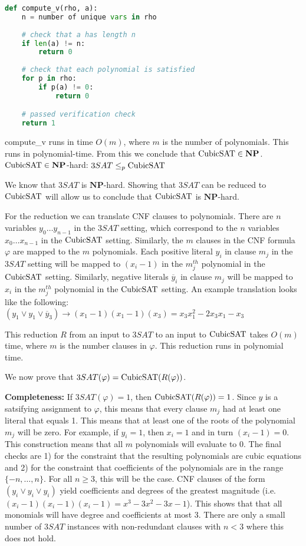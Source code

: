 \documentclass[11pt]{article}
\begin{document}
\begin{lstlisting}[language=Python]
def compute_v(rho, a):
    n = number of unique vars in rho
    
    # check that a has length n
    if len(a) != n:
        return 0
    
    # check that each polynomial is satisfied
    for p in rho:
        if p(a) != 0:
            return 0

    # passed verification check
    return 1
\end{lstlisting}

compute\_v runs in time $O(m)$, where $m$ is the number of polynomials. This runs in polynomial-time. From this we conclude that $\mathrm{CubicSAT} \in \mathbf{NP}$.\\

$\mathrm{CubicSAT} \in \mathbf{NP}$-hard: $3SAT \leq_p \mathrm{CubicSAT}$ 

We know that $3SAT$ is $\mathbf{NP}$-hard. Showing that $3SAT$ can be reduced to $\mathrm{CubicSAT}$ will allow us to conclude that $\mathrm{CubicSAT}$ is $\mathbf{NP}$-hard.

For the reduction we can translate CNF clauses to polynomials. There are $n$ variables $y_0 \ldots y_{n-1}$ in the $3SAT$ setting, which correspond to the $n$ variables $x_0 \ldots x_{n-1}$ in the $\mathrm{CubicSAT}$ setting. Similarly, the $m$ clauses in the CNF formula $\varphi$ are mapped to the $m$ polynomials. Each positive literal $y_i$ in clause $m_j$ in the $3SAT$ setting will be mapped to $(x_i - 1)$ in the $m_j^{th}$ polynomial in the $\mathrm{CubicSAT}$ setting. Similarly, negative literals $\overline{y}_i$ in clause $m_j$ will be mapped to $x_i$ in the $m_j^{th}$ polynomial in the $\mathrm{CubicSAT}$ setting. An example translation looks like the following: $(y_1 \lor y_1 \lor \overline{y}_3) \to (x_1 - 1)(x_1 - 1)(x_3) = x_3x_1^2 - 2x_3x_1 - x_3$

This reduction $R$ from an input to $3SAT$ to an input to $\mathrm{CubicSAT}$ takes $O(m)$ time, where $m$ is the number clauses in $\varphi$. This reduction runs in polynomial time.

We now prove that $3SAT(\varphi) = \mathrm{CubicSAT}(R(\varphi))$.

\textbf{Completeness:} If $3SAT(\varphi) = 1$, then $\mathrm{CubicSAT}(R(\varphi)) = 1$. Since $y$ is a satsifying assignment to $\varphi$, this means that every clause $m_j$ had at least one literal that equals 1. This means that at least one of the roots of the polynomial $m_j$ will be zero. For example, if $y_i = 1$, then $x_i = 1$ and in turn $(x_i - 1) = 0$. This construction means that all $m$ polynomials will evaluate to 0. The final checks are 1) for the constraint that the resulting polynomials are cubic equations and 2) for the constraint that coefficients of the polynomials are in the range $\{-n, \ldots, n\}$. For all $n\geq 3$, this will be the case. CNF clauses of the form $(y_i \lor y_i \lor y_i)$ yield coefficients and degrees of the greatest magnitude (i.e. $ (x_i - 1)(x_i - 1)(x_i - 1) = x^3 - 3x^2 - 3x - 1$). This shows that that all monomials will have degree and coefficients at most 3. There are only a small number of $3SAT$ instances with non-redundant clauses with $n < 3$ where this does not hold.
\end{document}
